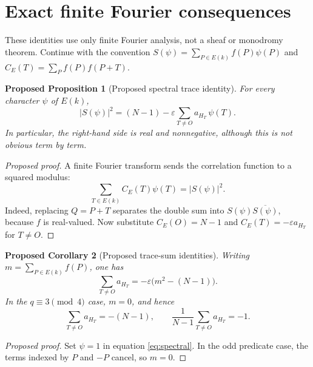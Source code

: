 \documentclass[11pt,a4paper]{article}
\numberwithin{equation}{section}
\newtheorem{prop}{Proposed Proposition}[section]
\newtheorem{cor}[prop]{Proposed Corollary}
\begin{document}
\section{Exact finite Fourier consequences}
These identities use only finite Fourier analysis, not a sheaf or
monodromy theorem. Continue with the convention
\(S(\psi)=\sum_{P\in E(k)}f(P)\psi(P)\) and
\(C_E(T)=\sum_{P}f(P)f(P+T)\).

\begin{prop}[Proposed spectral trace identity]
For every character \(\psi\) of \(E(k)\),
\begin{equation}\label{eq:spectral}
\boxed{\left|S(\psi)\right|^2
 =(N-1)-\varepsilon\sum_{T\ne O}
 a_{H_T}\,\psi(T).}
\end{equation}
In particular, the right-hand side is real and nonnegative, although
this is not obvious term by term.
\end{prop}
\begin{proof}[Proposed proof]
A finite Fourier transform sends the correlation function to a
squared modulus:
\[
\sum_{T\in E(k)}C_E(T)\psi(T)=|S(\psi)|^2.
\]
Indeed, replacing \(Q=P+T\) separates the double sum into
\(S(\psi)\overline{S(\psi)}\), because \(f\) is real-valued.
Now substitute \(C_E(O)=N-1\) and
\(C_E(T)=-\varepsilon a_{H_T}\) for \(T\ne O\).
\end{proof}

\begin{cor}[Proposed trace-sum identities]
Writing \(m=\sum_{P\in E(k)}f(P)\), one has
\begin{equation}\label{eq:tracesum}
\boxed{\sum_{T\ne O}a_{H_T}
 =-\varepsilon\bigl(m^2-(N-1)\bigr).}
\end{equation}
In the \(q\equiv3\pmod4\) case, \(m=0\), and hence
\begin{equation}\label{eq:tracemean}
\boxed{\sum_{T\ne O}a_{H_T}=-(N-1),\qquad
\frac1{N-1}\sum_{T\ne O}a_{H_T}=-1.}
\end{equation}
\end{cor}
\begin{proof}[Proposed proof]
Set \(\psi=1\) in equation \eqref{eq:spectral}. In the odd
predicate case, the terms indexed by \(P\) and \(-P\) cancel, so
\(m=0\).
\end{proof}
\end{document}
